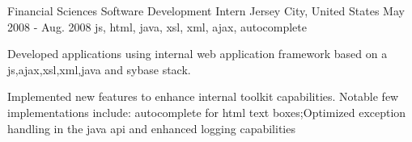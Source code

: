 \cventry
    {Financial Sciences} %
    {Software Development Intern} %
    {Jersey City, United States} %
    {May 2008 - Aug. 2008} %
    { js, html, java, xsl, xml, ajax, autocomplete }
    {
        \vspace{-4.0mm}
    \begin{cvitems} %
        \item { Developed applications using internal web application framework based on a js,ajax,xsl,xml,java and sybase stack. }
        \item { Implemented new features to enhance internal toolkit capabilities. Notable few implementations include: autocomplete for html text boxes;Optimized exception handling in the java api and enhanced logging capabilities }
    \end{cvitems}
    }